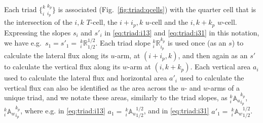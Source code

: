 Each triad $\{_i^k\:_{i_p}^{k_p}\}$ is associated (Fig.~\ref{fig:triad:qcells}) with the quarter
cell that is the intersection of the $i,k$ $T$-cell, the $i+i_p,k$
$u$-cell and the $i,k+k_p$ $w$-cell. Expressing the slopes $s_i$ and
$s'_i$ in \eqref{eq:triad:i13} and \eqref{eq:triad:i31} in this notation, we have
e.g.\ $s_1=s'_1={\:}_i^k \mathbb{R}_{1/2}^{1/2}$. Each triad slope $_i^k
\mathbb{R}_{i_p}^{k_p}$ is used once (as an $s$) to calculate the
lateral flux along its $u$-arm, at $(i+i_p,k)$, and then again as an
$s'$ to calculate the vertical flux along its $w$-arm at
$(i,k+k_p)$. Each vertical area $a_i$ used to calculate the lateral
flux and horizontal area $a'_i$ used to calculate the vertical flux
can also be identified as the area across the $u$- and $w$-arms of a
unique triad, and we notate these areas, similarly to the triad
slopes, as $_i^k{\mathbb{A}_u}_{i_p}^{k_p}$,
$_i^k{\mathbb{A}_w}_{i_p}^{k_p}$, where e.g. in \eqref{eq:triad:i13}
$a_{1}={\:}_i^k{\mathbb{A}_u}_{1/2}^{1/2}$, and in \eqref{eq:triad:i31}
$a'_{1}={\:}_i^k{\mathbb{A}_w}_{1/2}^{1/2}$.

